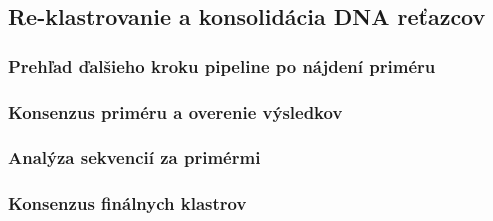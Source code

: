 \subsection{Re-klastrovanie a konsolidácia DNA reťazcov}

\subsubsection{Prehľad ďalšieho kroku pipeline po nájdení priméru}


\subsubsection{Konsenzus priméru a overenie výsledkov}


\subsubsection{Analýza sekvencií za primérmi}


\subsubsection{Konsenzus finálnych klastrov}
